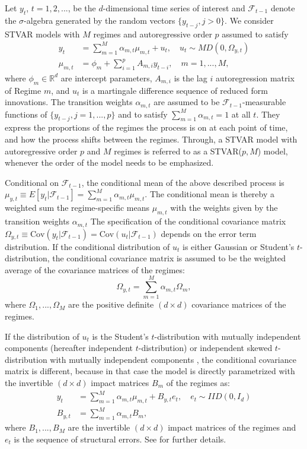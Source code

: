 \documentclass[nojss]{jss}
\begin{document}
Let $y_t$, $t=1,2,...$, be the $d$-dimensional time series of interest and $\mathcal{F}_{t-1}$ denote the $\sigma$-algebra generated by the random vectors $\lbrace y_{t-j}, j>0 \rbrace$. We consider STVAR models with $M$ regimes and autoregressive order $p$ assumed to satisfy
\begin{align}
y_t &=\sum_{m=1}^M \alpha_{m,t}\mu_{m,t} + u_t, \quad u_{t} \sim MD(0, \Omega_{y,t})\label{eq:stvar1} \\
\mu_{m,t} &= \phi_m + \sum_{i=1}^{p}A_{m,i}y_{t-i}, \quad m=1,...,M,\label{eq:stvar2}
\end{align}
where $\phi_m\in\mathbb{R}^{d}$ are intercept parameters, $A_{m,i}$ is the lag $i$ autoregression matrix of Regime $m$, and $u_t$ is a martingale difference sequence of reduced form innovations. The transition weights $\alpha_{m,t}$ are assumed to be $\mathcal{F}_{t-1}$-measurable functions of $\lbrace y_{t-j}, j=1,...,p \rbrace$ and to satisfy $\sum_{m=1}^{M}\alpha_{m,t}=1$ at all $t$. They express the proportions of the regimes the process is on at each point of time, and how the process shifts between the regimes. Through, a STVAR model with autoregressive order $p$ and $M$ regimes is referred to as a STVAR($p,M$) model, whenever the order of the model needs to be emphasized.

Conditional on $\mathcal{F}_{t-1}$, the conditional mean of the above described process is $\mu_{y,t} \equiv E[y_t|\mathcal{F}_{t-1}] = \sum_{m=1}^M \alpha_{m,t}\mu_{m,t}$. The conditional mean is thereby a weighted sum the regime-specific means $\mu_{m,t}$ with the weights given by the transition weights $\alpha_{m,t}$ The specification of the conditional covariance matrix $\Omega_{y,t}\equiv \text{Cov}(y_t|\mathcal{F}_{t-1})=\text{Cov}(u_t|\mathcal{F}_{t-1})$ depends on the error term distribution. If the conditional distribution of $u_{t}$ is either Gaussian or Student's $t$-distribution, the conditional covariance matrix is assumed to be the weighted average of the covariance matrices of the regimes:
\begin{equation}
\Omega_{y,t} = \sum_{m=1}^M \alpha_{m,t}\Omega_m,
\end{equation}
where $\Omega_1,...,\Omega_M$ are the positive definite $(d\times d)$ covariance matrices of the regimes.

If the distribution of $u_{t}$ is the Student's $t$-distribution with mutually independent components (hereafter independent $t$-distribution) or independent skewed $t$-distribution with mutually independent components \citep[see][]{Hansen:1994}, the conditional covariance matrix is different, because in that case the model is directly parametrized with the invertible $(d\times d)$ impact matrices $B_m$ of the regimes as:
\begin{align}
y_t &=\sum_{m=1}^M \alpha_{m,t}\mu_{m,t} + B_{y,t}e_t, \quad e_{t} \sim IID(0, I_d)\label{eq:bstvar1} \\
B_{y,t} &= \sum_{m=1}^{M}\alpha_{m,t}B_m,\label{eq:bstvar2}
\end{align}
where $B_1,...,B_M$ are the invertible $(d\times d)$ impact matrices of the regimes and $e_t$ is the sequence of structural errors. See \cite{Virolainen2:2024} for further details.
\end{document}
